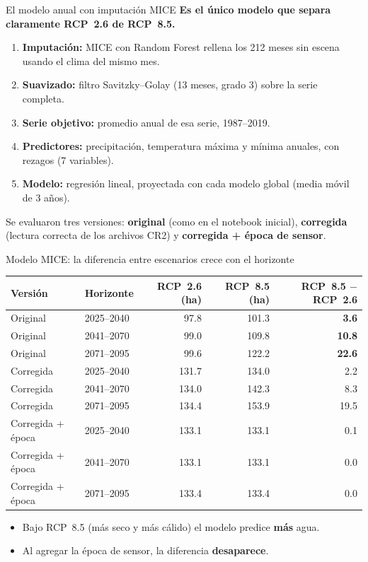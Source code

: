 \documentclass[10pt]{beamer}
\newcommand{\dato}[1]{\textbf{\color{blue!60!black}#1}}
\begin{document}
\begin{frame}{El modelo anual con imputación MICE}
\textbf{Es el único modelo que separa claramente RCP~2.6 de RCP~8.5.}
\vspace{2mm}
\begin{enumerate}
\item \textbf{Imputación:} MICE con Random Forest rellena los 212 meses sin escena usando el clima del mismo mes.
\item \textbf{Suavizado:} filtro Savitzky--Golay (13 meses, grado 3) sobre la serie completa.
\item \textbf{Serie objetivo:} promedio anual de esa serie, 1987--2019.
\item \textbf{Predictores:} precipitación, temperatura máxima y mínima anuales, con rezagos (7 variables).
\item \textbf{Modelo:} regresión lineal, proyectada con cada modelo global (media móvil de 3 años).
\end{enumerate}
\vspace{2mm}
Se evaluaron tres versiones: \textbf{original} (como en el notebook inicial), \textbf{corregida} (lectura correcta de los archivos CR2) y \textbf{corregida + época de sensor}.
\end{frame}

\begin{frame}{Modelo MICE: la diferencia entre escenarios crece con el horizonte}
\centering
\small
\begin{tabular}{llrrr}
\toprule
Versión & Horizonte & RCP~2.6 (ha) & RCP~8.5 (ha) & RCP~8.5 $-$ RCP~2.6 \\
\midrule
Original & 2025--2040 & 97.8 & 101.3 & \dato{3.6} \\
Original & 2041--2070 & 99.0 & 109.8 & \dato{10.8} \\
Original & 2071--2095 & 99.6 & 122.2 & \dato{22.6} \\
\midrule
Corregida & 2025--2040 & 131.7 & 134.0 & 2.2 \\
Corregida & 2041--2070 & 134.0 & 142.3 & 8.3 \\
Corregida & 2071--2095 & 134.4 & 153.9 & 19.5 \\
\midrule
Corregida + época & 2025--2040 & 133.1 & 133.1 & 0.1 \\
Corregida + época & 2041--2070 & 133.1 & 133.1 & 0.0 \\
Corregida + época & 2071--2095 & 133.4 & 133.4 & 0.0 \\
\bottomrule
\end{tabular}
\vspace{3mm}
\begin{itemize}
\item Bajo RCP~8.5 (más seco y más cálido) el modelo predice \textbf{más} agua.
\item Al agregar la época de sensor, la diferencia \textbf{desaparece}.
\end{itemize}
\end{frame}
\end{document}

